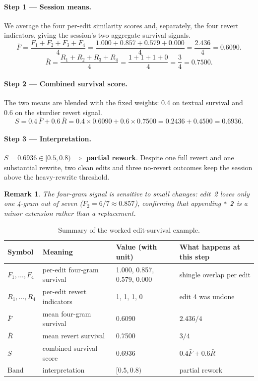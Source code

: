 \documentclass[11pt,a4paper]{article}
\newtheorem{remark}{Remark}
\begin{document}
\paragraph{Step 1 — Session means.}
We average the four per-edit similarity scores and, separately, the four
revert indicators, giving the session's two aggregate survival signals.
\[
  \bar{F} = \frac{F_1 + F_2 + F_3 + F_4}{4}
           = \frac{1.000 + 0.857 + 0.579 + 0.000}{4}
           = \frac{2.436}{4} = 0.6090.
\]
\[
  \bar{R} = \frac{R_1 + R_2 + R_3 + R_4}{4}
           = \frac{1 + 1 + 1 + 0}{4}
           = \frac{3}{4} = 0.7500.
\]

\paragraph{Step 2 --- Combined survival score.}
The two means are blended with the fixed weights: 0.4 on textual
survival and 0.6 on the sturdier revert signal.
\[
  S = 0.4\,\bar{F} + 0.6\,\bar{R}
    = 0.4 \times 0.6090 + 0.6 \times 0.7500
    = 0.2436 + 0.4500
    = 0.6936.
\]

\paragraph{Step 3 --- Interpretation.}
$S = 0.6936 \in [0.5, 0.8)$ $\Rightarrow$ \textbf{partial rework}.
Despite one full revert and one substantial rewrite, two clean edits and
three no-revert outcomes keep the session above the heavy-rewrite threshold.

\begin{remark}
The four-gram signal is sensitive to small changes: edit~2 loses only one
4-gram out of seven ($F_2 = 6/7 \approx 0.857$), confirming that appending
\texttt{* 2} is a minor extension rather than a replacement.
\end{remark}

\begin{table}[h!]
\centering
\caption{Summary of the worked edit-survival example.}
\label{tab:edit-survival-worked}
\begin{tabular}{@{}llll@{}}
\toprule
Symbol & Meaning & Value (with unit) & What happens at this step \\
\midrule
$F_1, \ldots, F_4$ & per-edit four-gram survival & 1.000, 0.857, 0.579, 0.000 & shingle overlap per edit \\
$R_1, \ldots, R_4$ & per-edit revert indicators & 1, 1, 1, 0 & edit 4 was undone \\
$\bar{F}$ & mean four-gram survival & 0.6090 & $2.436 / 4$ \\
$\bar{R}$ & mean revert survival & 0.7500 & $3 / 4$ \\
$S$ & combined survival score & 0.6936 & $0.4\bar{F} + 0.6\bar{R}$ \\
Band & interpretation & $[0.5, 0.8)$ & partial rework \\
\bottomrule
\end{tabular}
\end{table}
\end{document}

